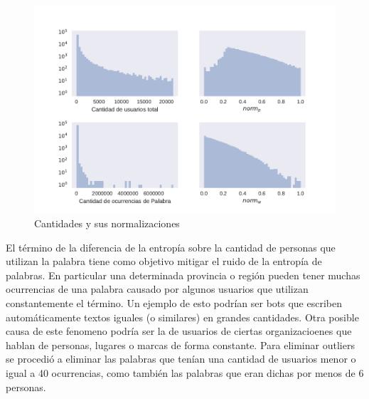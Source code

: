 \begin{figure}[!ht]
\centering
\includegraphics[width=1.0\textwidth]{./images/cantNorms.pdf}
\caption{Cantidades y sus normalizaciones} 
\label{fig:cantNorms} 
\end{figure}

El término de la diferencia de la entropía sobre la cantidad de personas que utilizan la palabra tiene como objetivo mitigar el ruido de la entropía de palabras. En particular una determinada provincia o región pueden tener muchas ocurrencias de una palabra causado por algunos usuarios que utilizan constantemente el término. Un ejemplo de esto podrían ser bots que escriben automáticamente textos iguales (o similares) en grandes cantidades. Otra posible causa de este fenomeno podría ser la de usuarios de ciertas organizacioenes que hablan de personas, lugares o marcas de forma constante. 
Para eliminar outliers se procedió a eliminar las palabras que tenían una cantidad de usuarios menor o igual a 40 ocurrencias, como también las palabras que eran dichas por menos de 6 personas. 

